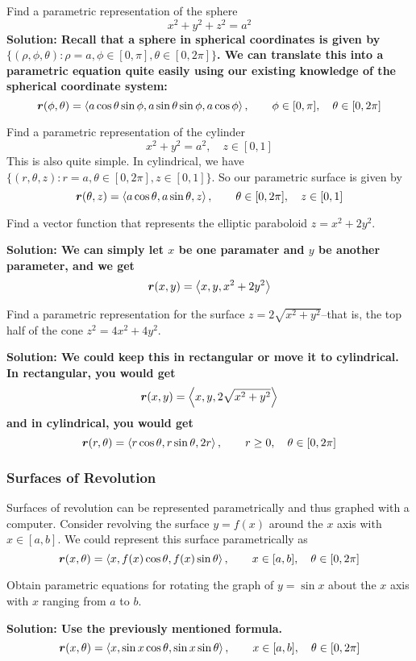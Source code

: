 \begin{example}
    Find a parametric representation of the sphere
    \[ x^2+y^2+z^2=a^2\]
    \bf{Solution:} Recall that a sphere in spherical coordinates is given by $\{(\rho, \phi, \theta): \rho = a, \phi\in[0, \pi], \theta\in[0, 2\pi]\}$. We can translate this into a parametric equation quite easily using our existing knowledge of the spherical coordinate system:
    \[ \boldsymbol{r}(\phi, \theta) = \left\langle a\cos\theta\sin \phi , a\sin \theta\sin\phi, a\cos\phi\right\rangle, \qquad \phi\in[0,\pi], \quad \theta\in[0,2\pi]\]
\end{example}
\begin{example}
    Find a parametric representation of the cylinder
    \[ x^2+y^2 = a^2, \quad z\in[0, 1]\]
    This is also quite simple. In cylindrical, we have $\{(r,\theta, z): r=a, \theta\in[0,2\pi], z\in[0,1]\}$. So our parametric surface is given by
    \[ \boldsymbol{r}(\theta, z) = \left\langle a\cos\theta, a\sin\theta, z\right\rangle, \qquad \theta\in[0,2\pi], \quad z\in[0,1]\]
\end{example}
\begin{example}
    Find a vector function that represents the elliptic paraboloid $z=x^2+2y^2$.\par
    \bf{Solution:} We can simply let $x$ be one paramater and $y$ be another parameter, and we get
    \[ \boldsymbol{r}(x,y) = \left\langle x, y, x^2+2y^2\right\rangle\]
\end{example}
\begin{example}
    Find a parametric representation for the surface $z=2\sqrt{x^2+y^2}$--that is, the top half of the cone $z^2=4x^2+4y^2$. \par
    \bf{Solution:} We could keep this in rectangular or move it to cylindrical. In rectangular, you would get
    \[ \boldsymbol{r}(x,y) = \left\langle x,y, 2\sqrt{x^2+y^2}\right\rangle\]
    and in cylindrical, you would get
    \[ \boldsymbol{r}(r, \theta) = \left\langle r\cos \theta, r\sin \theta, 2r\right\rangle, \qquad r\geq 0,\quad \theta\in[0,2\pi] \]
\end{example}
\subsubsection{Surfaces of Revolution}
Surfaces of revolution can be represented parametrically and thus graphed with a computer. Consider revolving the surface $y=f(x)$ around the $x$ axis with $x\in[a,b]$. We could represent this surface parametrically as 
\[ \boldsymbol{r}(x, \theta) = \left\langle x, f(x)\cos\theta, f(x)\sin\theta\right\rangle, \qquad x\in[a,b],\quad \theta\in[0,2\pi]\]
\begin{example}
    Obtain parametric equations for rotating the graph of $y=\sin x$ about the $x$ axis with $x$ ranging from $a$ to $b$. \par
    \bf{Solution:} Use the previously mentioned formula.
    \[ \boldsymbol{r}(x,\theta) = \left\langle x, \sin x\cos\theta, \sin x\sin \theta\right\rangle,\qquad x\in[a,b],\quad \theta\in[0,2\pi]\]
\end{example}
